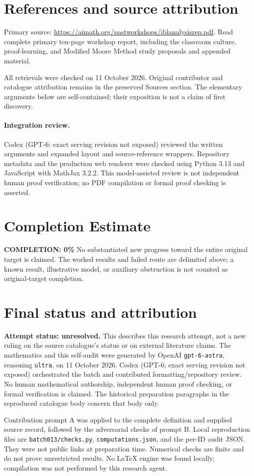 \documentclass[11pt]{article}
\begin{document}
\section{References and source attribution}
Primary source: \url{https://aimath.org/pastworkshops/iblanalysisrep.pdf}. Read complete primary ten-page workshop report, including the classroom culture, proof-learning, and Modified Moore Method study proposals and appended material.

All retrievals were checked on 11 October 2026. Original contributor and catalogue attribution remains in the preserved Sources section. The elementary arguments below are self-contained; their exposition is not a claim of first discovery.


\paragraph{Integration review.} Codex (GPT-6; exact serving revision not exposed) reviewed the written arguments and expanded layout and source-reference wrappers. Repository metadata and the production web renderer were checked using Python 3.13 and JavaScript with MathJax 3.2.2. This model-assisted review is not independent human proof verification; no PDF compilation or formal proof checking is asserted.

\section{Completion Estimate}
\noindent\textbf{COMPLETION: 0\%}
No substantiated new progress toward the entire original target is claimed. The worked results and failed route are delimited above; a known result, illustrative model, or auxiliary obstruction is not counted as original-target completion.

\section{Final status and attribution}
\textbf{Attempt status: unresolved.} This describes this research attempt, not a new ruling on the source catalogue's status or on external literature claims.
The mathematics and this self-audit were generated by OpenAI \texttt{gpt-6-astra}, reasoning \texttt{ultra}, on 11 October 2026. Codex (GPT-6; exact serving revision not exposed) orchestrated the batch and contributed formatting/repository review. No human mathematical authorship, independent human proof checking, or formal verification is claimed. The historical preparation paragraphs in the reproduced catalogue body concern that body only.

Contribution prompt A was applied to the complete definition and supplied source record, followed by the adversarial checks of prompt B. Local reproduction files are \texttt{batch013/checks.py}, \texttt{computations.json}, and the per-ID audit JSON. They were not public links at preparation time. Numerical checks are finite and do not prove unrestricted results. No LaTeX engine was found locally; compilation was not performed by this research agent.
\end{document}
